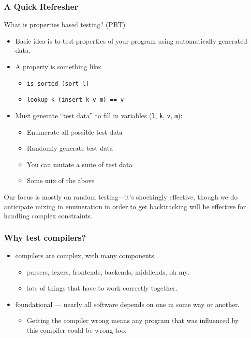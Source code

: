 \documentclass{beamer}
\begin{document}
\begin{frame}
  \frametitle{A Quick Refresher}
  What is properties based testing? (PBT)

  \begin{itemize}
  \item Basic idea is to test properties of your program using
    automatically generated data.
  \item A property is something like:
    \begin{itemize}
    \item {\tt is\_sorted (sort l)}
    \item {\tt lookup k (insert k v m) == v}
    \end{itemize}
  \item Must generate ``test data'' to fill in variables ({\tt l}, {\tt k}, {\tt v}, {\tt m}):
    \begin{itemize}
    \item Enumerate all possible test data
    \item Randomly generate test data
    \item You can mutate a suite of test data~\cite{10.1145/3360607}
    \item Some mix of the above
    \end{itemize}
  \end{itemize}
  
  \pause
  
  Our focus is mostly on random testing---it's shockingly effective,
  though we do anticipate mixing in enumeration in order to get
  backtracking will be effective for handling complex constraints.
\end{frame}

\begin{frame}
  \frametitle{Why test compilers?}
  \begin{itemize}
  \item compilers are complex, with many components
          \begin{itemize}
          \item parsers, lexers, frontends, backends, middlends, oh my.
          \item lots of things that have to work correctly together.
          \end{itemize}
  \item foundational --- nearly all software depends on one in some
    way or another.
    \begin{itemize}
    \item Getting the compiler wrong means any program that was
      influenced by this compiler could be wrong too.
    \end{itemize}
  \end{itemize}
\end{frame}
\end{document}
